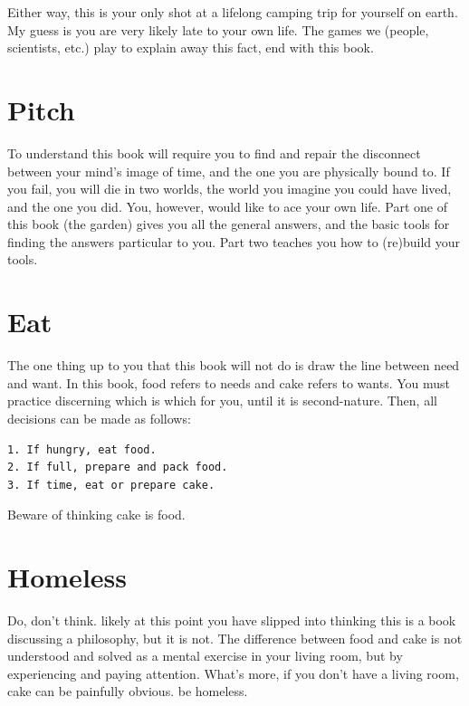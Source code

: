 \documentclass[
]{book}
\begin{document}
Either way, this is your only shot at a lifelong camping trip for yourself on earth.
My guess is you are very likely late to your own life.
The games we (people, scientists, etc.) play to explain away this fact, end with this book.

\hypertarget{intro-pitch}{%
\section{Pitch}\label{intro-pitch}}

To understand this book will require you to find and repair the disconnect between your mind's image of time, and the one you are physically bound to.
If you fail, you will die in two worlds, the world you imagine you could have lived, and the one you did.
You, however, would like to ace your own life.
Part one of this book (the garden) gives you all the general answers, and the basic tools for finding the answers particular to you.
Part two teaches you how to (re)build your tools.

\hypertarget{eat}{%
\section{Eat}\label{eat}}

The one thing up to you that this book will not do is draw the line between need and want.
In this book, food refers to needs and cake refers to wants.
You must practice discerning which is which for you, until it is second-nature.
Then, all decisions can be made as follows:

\begin{verbatim}
1. If hungry, eat food.
2. If full, prepare and pack food.
3. If time, eat or prepare cake.
\end{verbatim}

Beware of thinking cake is food.

\hypertarget{homeless}{%
\section{Homeless}\label{homeless}}

Do, don't think. likely at this point you have slipped into thinking this is a book discussing a philosophy, but it is not.
The difference between food and cake is not understood and solved as a mental exercise in your living room, but by experiencing and paying attention.
What's more, if you don't have a living room, cake can be painfully obvious. be homeless.
\end{document}
